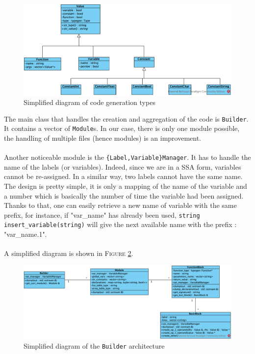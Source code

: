 \documentclass[a4paper,11pt]{article}
\begin{document}
\begin{figure}[h]
	\centering
	\includegraphics[scale=0.8]{Value.png}
	\caption{Simplified diagram of code generation types}
	\label{codegen:value}
\end{figure}

The main class that handles the creation and aggregation of the code is \texttt{Builder}. It contains a vector of \texttt{Module}s. In our case, there is only one module possible, the handling of multiple files (hence modules) is an improvement.

\paragraph{}

Another noticeable module is the \texttt{\{Label,Variable\}Manager}. It has to handle the name of the labels (or variables). Indeed, since we are in a SSA form, variables cannot be re-assigned. In a similar way, two labels cannot have the same name. The design is pretty simple, it is only a mapping of the name of the variable and a number which is basically the number of time the variable had been assigned. Thanks to that, one can easily retrieve a new name of variable with the same prefix, for instance, if "var\_name" has already been used, \texttt{string insert\_variable(string)} will give the next available name with the prefix : "var\_name.1".

\paragraph{}

A simplified diagram is shown in \textsc{Figure} \ref{codegen:builder}.

\begin{figure}
	\centering
	\includegraphics[scale=0.7]{Builder.png}
	\caption{Simplified diagram of the \texttt{Builder} architecture}
	\label{codegen:builder}
\end{figure}
\end{document}
